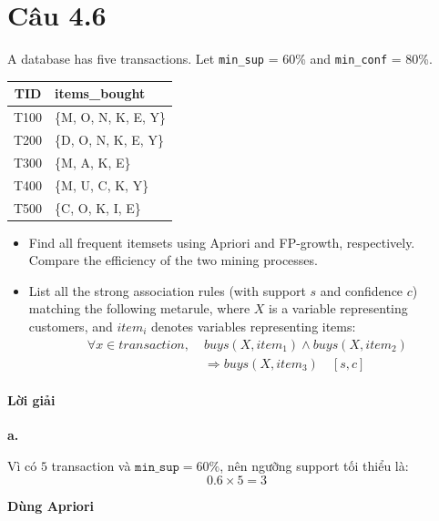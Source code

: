 \section{Câu 4.6}
A database has five transactions. Let \texttt{min\_sup} = 60\% and \texttt{min\_conf} = 80\%.

\begin{center}
    \begin{tabular}{|c|l|}
        \hline
        TID  & items\_bought        \\
        \hline
        T100 & \{M, O, N, K, E, Y\} \\
        T200 & \{D, O, N, K, E, Y\} \\
        T300 & \{M, A, K, E\}       \\
        T400 & \{M, U, C, K, Y\}    \\
        T500 & \{C, O, K, I, E\}    \\
        \hline
    \end{tabular}
\end{center}

\begin{itemize}
    \item[a.] Find all frequent itemsets using Apriori and FP-growth, respectively. Compare the efficiency of the two mining processes.
    \item[b.] List all the strong association rules (with support $s$ and confidence $c$) matching the following metarule, where $X$ is a variable representing customers, and $item_i$ denotes variables representing items:
          \[
              \begin{aligned}
                  \forall x \in transaction,\; & buys(X,item_1) \land buys(X,item_2)   \\
                                               & \Rightarrow buys(X,item_3)\quad [s,c]
              \end{aligned}
          \]
\end{itemize}

\paragraph{Lời giải}
\noindent \textbf{a.}

Vì có $5$ transaction và $\texttt{min\_sup}=60\%$, nên ngưỡng support tối thiểu là:
\[
    0.6 \times 5 = 3
\]

\textbf{Dùng Apriori}


